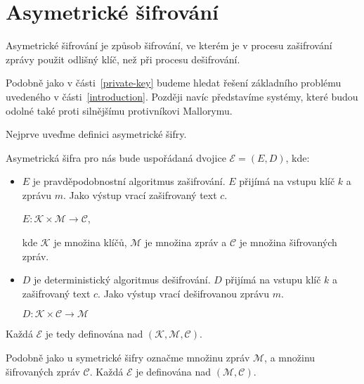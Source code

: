 \documentclass[
  program=infoi,
  biblatex,
  figures=false,
  glossaries,
  index
]{kidiplom}
\begin{document}
    \newpage
    

\part{Asymetrické šifrování}\label{public-key}

        
    Asymetrické šifrování je způsob šifrování, ve kterém je v procesu zašifrování zprávy použit odlišný klíč, než při procesu dešifrování.

    Podobně jako v části~\ref{private-key} budeme hledat řešení základního problému uvedeného v části~\ref{introduction}.
    Později navíc představíme systémy, které budou odolné také proti silnějšímu protivníkovi Mallorymu.

    Nejprve uveďme definici asymetrické šifry.

    \medskip

    Asymetrická šifra pro nás bude uspořádaná dvojice $\mathcal{E}  = (E, D)$, kde:

    \begin{itemize}
        \item
            $E$ je pravděpodobnostní algoritmus zašifrování.
            $E$ přijímá na vstupu klíč $k$ a zprávu $m$.
            Jako výstup vrací zašifrovaný text $c$.

            \begin{center}
                $E: \mathcal{K} \times \mathcal{M} \rightarrow \mathcal{C}$,
            \end{center}

            kde $\mathcal{K}$ je množina klíčů, $\mathcal{M}$ je množina zpráv a 
            $\mathcal{C}$ je množina šifrovaných zpráv.

        \item
            $D$ je deterministický algoritmus dešifrování. $D$ přijímá na vstupu klíč $k$ a zašifrovaný text $c$.
            Jako výstup vrací dešifrovanou zprávu $m$.
            
            \begin{center}
                $D: \mathcal{K} \times \mathcal{C} \rightarrow \mathcal{M}$
            \end{center}

    \end{itemize}

    Každá $\mathcal{E}$ je tedy definována nad $(\mathcal{K},\mathcal{M},\mathcal{C})$.

    Podobně jako u symetrické šifry označme množinu zpráv $\mathcal{M}$, a množinu šifrovaných zpráv $\mathcal{C}$.
    Každá $\mathcal{E}$ je definována nad $(\mathcal{M},\mathcal{C})$.
\end{document}
